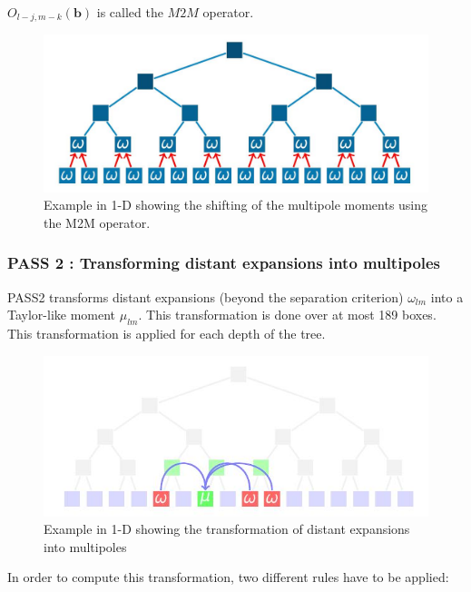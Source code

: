 \documentclass[12pt,twoside,a4paper]{report}
\begin{document}
   $O_{l-j,m-k}(\textbf{b})$ is called the $M2M$ operator.
   
   \begin{figure}[H]
   \includegraphics[scale=0.4]{ShiftMultipole}
    \centering 
    \caption{Example in 1-D showing the shifting of the multipole moments using the M2M operator. }
    \label{fig:multipole}
   \end{figure}
   
   
   	\subsubsection{PASS 2 : Transforming distant expansions into multipoles}
   	
   PASS2 transforms distant expansions (beyond the separation criterion) $\omega_{lm}$ into a Taylor-like moment $\mu_{lm}$. This transformation is done over at most 189 boxes. This transformation is applied for each depth of the tree.  
   	
   	
 \begin{figure}[H]
 	\label{fig:M2L}
   \includegraphics[scale=0.8]{transformExpansions1}
    \centering 
    \caption{Example in 1-D showing the transformation of distant expansions into multipoles}
    
   \end{figure}
   
	In order to compute this transformation, two different rules have to be applied:
	
\end{document}
